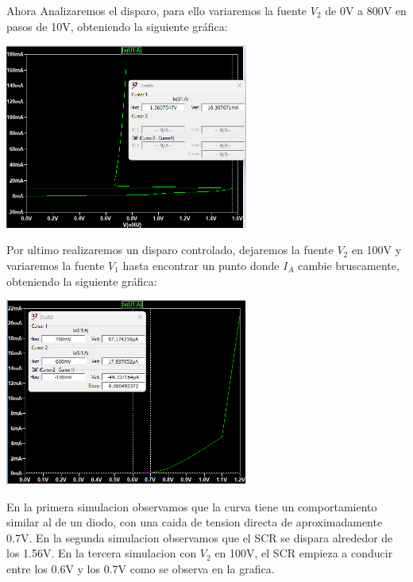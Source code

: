 Ahora Analizaremos el disparo, para ello variaremos la fuente $V_2$ de 0V a 800V en pasos de 10V, obteniendo la siguiente gráfica:

\includegraphics[width=8cm]{./imagenes/Simres2.png}

Por ultimo realizaremos un disparo controlado, dejaremos la fuente $V_2$ en 100V y variaremos la fuente $V_1$ hasta encontrar un punto donde $I_A$ cambie bruscamente, obteniendo la siguiente gráfica:

\includegraphics[width=8cm]{./imagenes/Simres3.png}

En la primera simulacion observamos que la curva tiene un comportamiento similar al de un diodo, con una caida de tension directa de aproximadamente 0.7V. En la segunda simulacion observamos que el SCR se dispara alrededor de los 1.56V. En la tercera simulacion con $V_2$ en 100V, el SCR empieza a conducir entre los 0.6V y los 0.7V como se observa en la grafica.